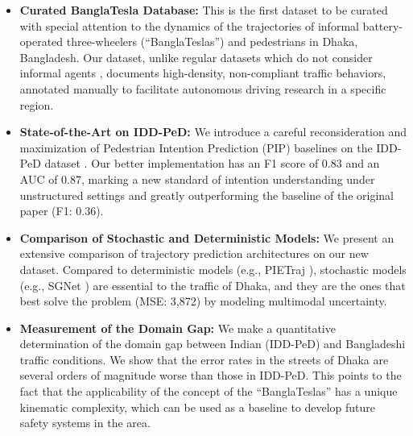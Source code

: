 \documentclass[12pt, a4paper]{article}
\begin{document}
\begin{itemize}
    \item \textbf{Curated BanglaTesla Database:} This is the first dataset to be curated with special attention to the dynamics of the trajectories of informal battery-operated three-wheelers (``BanglaTeslas'') \cite{jagonews2025banglatesla} and pedestrians in Dhaka, Bangladesh. Our dataset, unlike regular datasets which do not consider informal agents \cite{rasouli2019pie, sun2020scalability}, documents high-density, non-compliant traffic behaviors, annotated manually to facilitate autonomous driving research in a specific region.
    
    \item \textbf{State-of-the-Art on IDD-PeD:} We introduce a careful reconsideration and maximization of Pedestrian Intention Prediction (PIP) baselines on the IDD-PeD dataset \cite{bokkasam2025pedestrian}. Our better implementation has an F1 score of 0.83 and an AUC of 0.87, marking a new standard of intention understanding under unstructured settings and greatly outperforming the baseline of the original paper (F1: 0.36).
    
    \item \textbf{Comparison of Stochastic and Deterministic Models:} We present an extensive comparison of trajectory prediction architectures on our new dataset. Compared to deterministic models (e.g., PIETraj \cite{rasouli2019pie}), stochastic models (e.g., SGNet \cite{wang2022stepwise}) are essential to the traffic of Dhaka, and they are the ones that best solve the problem (MSE: 3,872) by modeling multimodal uncertainty.
    
    \item \textbf{Measurement of the Domain Gap:} We make a quantitative determination of the domain gap between Indian (IDD-PeD) \cite{bokkasam2025pedestrian} and Bangladeshi traffic conditions. We show that the error rates in the streets of Dhaka are several orders of magnitude worse than those in IDD-PeD. This points to the fact that the applicability of the concept of the ``BanglaTeslas'' has a unique kinematic complexity, which can be used as a baseline to develop future safety systems in the area.
\end{itemize}
\end{document}
